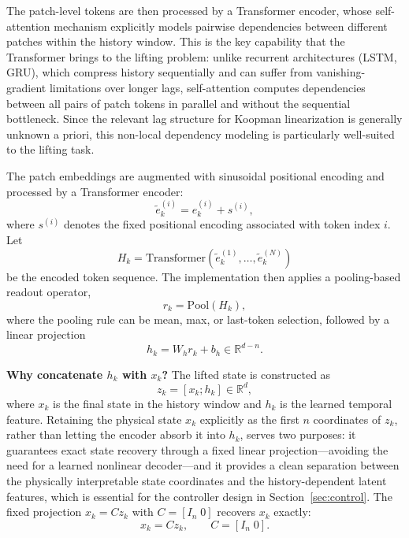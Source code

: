 \documentclass[journal]{IEEEtran}
\begin{document}
The patch-level tokens are then processed by a Transformer encoder, whose self-attention mechanism explicitly models pairwise dependencies between different patches within the history window. This is the key capability that the Transformer brings to the lifting problem: unlike recurrent architectures (LSTM, GRU), which compress history sequentially and can suffer from vanishing-gradient limitations over longer lags, self-attention computes dependencies between all pairs of patch tokens in parallel and without the sequential bottleneck. Since the relevant lag structure for Koopman linearization is generally unknown a priori, this non-local dependency modeling is particularly well-suited to the lifting task.

The patch embeddings are augmented with sinusoidal positional encoding and processed by a Transformer encoder:
\begin{equation}
    \tilde{e}_k^{(i)} = e_k^{(i)} + s^{(i)},
\end{equation}
where $s^{(i)}$ denotes the fixed positional encoding associated with token index $i$. Let
\begin{equation}
    H_k = \mathrm{Transformer}(\tilde{e}_k^{(1)},\ldots,\tilde{e}_k^{(N)})
\end{equation}
be the encoded token sequence. The implementation then applies a pooling-based readout operator,
\begin{equation}
    r_k = \mathrm{Pool}(H_k),
\end{equation}
where the pooling rule can be mean, max, or last-token selection, followed by a linear projection
\begin{equation}
    h_k = W_h r_k + b_h \in \mathbb{R}^{d-n}.
    \label{eq:history_feature}
\end{equation}

\textbf{Why concatenate $h_k$ with $x_k$?}
The lifted state is constructed as
\begin{equation}
    z_k = [x_k;h_k] \in \mathbb{R}^{d},
    \label{eq:lifted_state_form}
\end{equation}
where $x_k$ is the final state in the history window and $h_k$ is the learned temporal feature. Retaining the physical state $x_k$ explicitly as the first $n$ coordinates of $z_k$, rather than letting the encoder absorb it into $h_k$, serves two purposes: it guarantees exact state recovery through a fixed linear projection---avoiding the need for a learned nonlinear decoder---and it provides a clean separation between the physically interpretable state coordinates and the history-dependent latent features, which is essential for the controller design in Section~\ref{sec:control}. The fixed projection $x_k=Cz_k$ with $C=[I_n\;0]$ recovers $x_k$ exactly:
\begin{equation}
    x_k = C z_k, \qquad C = [I_n\;0].
    \label{eq:decoder_projection}
\end{equation}
\end{document}
